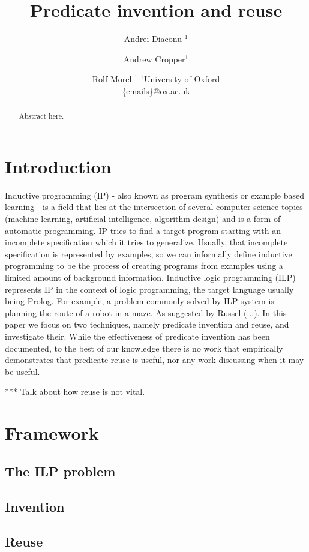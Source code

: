 \documentclass{article}
\title{Predicate invention and reuse}
\author{
Andrei Diaconu $^1$
\and
Andrew Cropper$^1$\and
Rolf Morel $^1$
\affiliations
$^1$University of Oxford\\
\emails
\{emails\}@ox.ac.uk}
\begin{document}
\maketitle




\begin{abstract}
Abstract here.
\end{abstract}

\section{Introduction}
Inductive programming (IP) \cite{indprogmeets} - also known as program synthesis or example based learning - is a field that lies at the intersection of several computer science topics (machine learning, artificial intelligence, algorithm design) and is a form of automatic programming. IP tries to find a target program starting with an incomplete specification which it tries to generalize. Usually, that incomplete specification is represented by examples, so we can informally define inductive programming to be the process of creating programs from examples using a limited amount of background information. Inductive logic programming (ILP) represents IP in the context of logic programming, the target language usually being Prolog. For example, a problem commonly solved by ILP system is planning the route of a robot in a maze. As suggested by Russel (...). In this paper we focus on two techniques, namely predicate invention and reuse, and investigate their. While the effectiveness of predicate invention has been documented, to the best of our knowledge there is no work that empirically demonstrates that predicate reuse is useful, nor any work discussing when it may be useful. 


*** Talk about how reuse is not vital.
\section{Framework}
\subsection{The ILP problem}
\subsection{Invention}
\subsection{Reuse}
\end{document}
